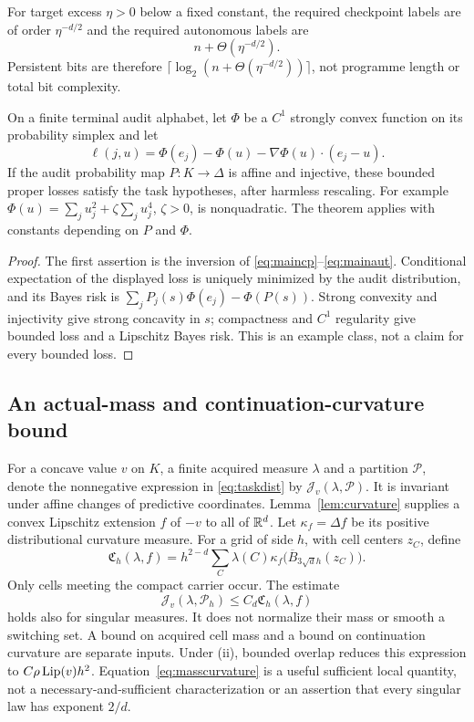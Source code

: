 \begin{corollary}\label{cor:resolution}
For target excess $\eta>0$ below a fixed constant, the required checkpoint labels are of order $\eta^{-d/2}$ and the required autonomous labels are
\[
 n+\Theta(\eta^{-d/2}).
\]
Persistent bits are therefore $\lceil\log_2(n+\Theta(\eta^{-d/2}))\rceil$, not programme length or total bit complexity.

On a finite terminal audit alphabet, let $\Phi$ be a $C^1$ strongly convex function on its probability simplex and let
\[
 \ell(j,u)=\Phi(e_j)-\Phi(u)-\nabla\Phi(u)\cdot(e_j-u).
\]
If the audit probability map $P:K\to\Delta$ is affine and injective, these bounded proper losses satisfy the task hypotheses, after harmless rescaling. For example $\Phi(u)=\sum_j u_j^2+\zeta\sum_j u_j^4$, $\zeta>0$, is nonquadratic. The theorem applies with constants depending on $P$ and $\Phi$.
\end{corollary}
\begin{proof}
The first assertion is the inversion of \eqref{eq:maincp}--\eqref{eq:mainaut}. Conditional expectation of the displayed loss is uniquely minimized by the audit distribution, and its Bayes risk is $\sum_jP_j(s)\Phi(e_j)-\Phi(P(s))$. Strong convexity and injectivity give strong concavity in $s$; compactness and $C^1$ regularity give bounded loss and a Lipschitz Bayes risk. This is an example class, not a claim for every bounded loss.
\end{proof}

\subsection{An actual-mass and continuation-curvature bound}
For a concave value $v$ on $K$, a finite acquired measure $\lambda$ and a partition $\mathcal P$, denote the nonnegative expression in \eqref{eq:taskdist} by $\mathcal J_v(\lambda,\mathcal P)$. It is invariant under affine changes of predictive coordinates. Lemma~\ref{lem:curvature} supplies a convex Lipschitz extension $f$ of $-v$ to all of $\mathbb R^d$. Let $\kappa_f=\Delta f$ be its positive distributional curvature measure. For a grid of side $h$, with cell centers $z_C$, define
\begin{equation}\label{eq:masscurvature}
 \mathfrak C_h(\lambda,f)=h^{2-d}\sum_C\lambda(C)
 \kappa_f\bigl(\overline B_{3\sqrt d h}(z_C)\bigr).
\end{equation}
Only cells meeting the compact carrier occur. The estimate
\[
 \mathcal J_v(\lambda,\mathcal P_h)\le C_d\mathfrak C_h(\lambda,f)
\]
holds also for singular measures. It does not normalize their mass or smooth a switching set. A bound on acquired cell mass and a bound on continuation curvature are separate inputs. Under (ii), bounded overlap reduces this expression to $C\rho\operatorname{Lip}(v)h^2$. Equation~\eqref{eq:masscurvature} is a useful sufficient local quantity, not a necessary-and-sufficient characterization or an assertion that every singular law has exponent $2/d$.
